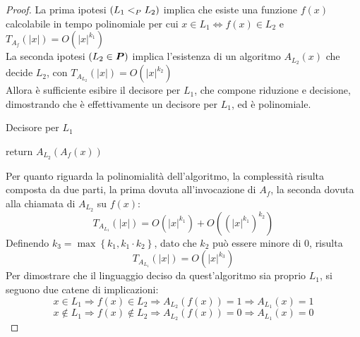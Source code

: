 \begin{proof}
    La prima ipotesi $\left( L_1 <_P L_2 \right)$ implica che esiste una funzione $f(x)$ calcolabile in tempo polinomiale per cui $x \in L_1 \Leftrightarrow f(x) \in L_2 $ e $ T_{A_{f}} (|x|) = O \left( |x|^{k_1} \right) $ \\
    La seconda ipotesi $ \left( L_2 \in \bm{P} \right) $ implica l'esistenza di un algoritmo $A_{L_{2}}(x)$ che decide $L_2$, con $ T_{A_{L_{2}}} (|x|) = O \left( |x|^{k_2} \right) $ \\
    Allora è sufficiente esibire il decisore per $L_1$, che compone riduzione e decisione, dimostrando che è effettivamente un decisore per $L_1$, ed è polinomiale.
\begin{algorithm}[H]
\caption{Decisore per $L_1$}\label{alg:decisorel1}
\begin{algorithmic}[1]
    \State return $A_{L_2}\left( A_{f} \left( x \right) \right)$
    \EndProcedure
\end{algorithmic}
\end{algorithm}
    Per quanto riguarda la polinomialità dell'algoritmo, la complessità risulta composta da due parti, la prima dovuta all'invocazione di $A_f$, la seconda dovuta alla chiamata di $A_{L_2}$ su $f(x)$:
    \begin{equation*}
        T_{A_{L_{1}}}(|x|) = O \left( |x|^{k_1} \right) + O \left( \left( |x|^{k_1} \right)^{k_2} \right)
    \end{equation*}
    Definendo $k_3 = \max \left\{ k_1, k_1 \cdot k_2 \right\}$, dato che $k_2$ può essere minore di $0$, risulta
    \begin{equation*}
        T_{A_{L_{1}}}(|x|) = O \left( |x|^{k_3} \right) 
    \end{equation*}
    Per dimostrare che il linguaggio deciso da quest'algoritmo sia proprio $L_1$, si seguono due catene di implicazioni:
    \begin{equation*}
        x \in L_1 
        \Rightarrow
        f(x) \in L_2 
        \Rightarrow
        A_{L_2}\left( f(x) \right) = 1
        \Rightarrow
        A_{L_1} (x) = 1
    \end{equation*}
    \begin{equation*}
        x \notin L_1 
        \Rightarrow
        f(x) \notin L_2 
        \Rightarrow
        A_{L_2}\left( f(x) \right) = 0
        \Rightarrow
        A_{L_1} (x) = 0
    \end{equation*}
\end{proof}

